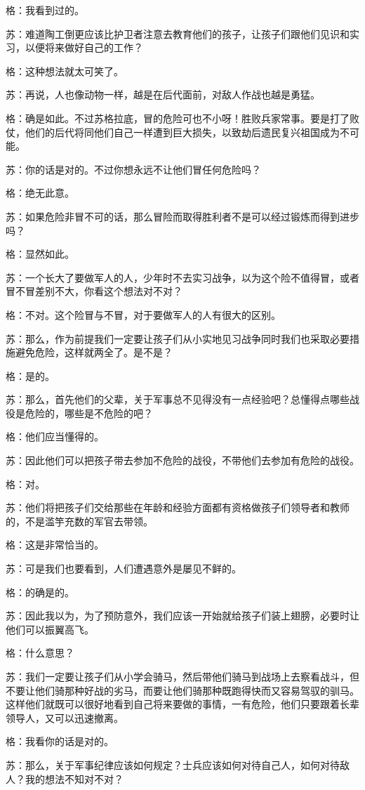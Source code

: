 \documentclass[12pt,oneside]{book}
\begin{document}
格：我看到过的。

苏：难道陶工倒更应该比护卫者注意去教育他们的孩子，让孩子们跟他们见识和实习，以便将来做好自己的工作？

格：这种想法就太可笑了。

苏：再说，人也像动物一样，越是在后代面前，对敌人作战也越是勇猛。

格：确是如此。不过苏格拉底，冒的危险可也不小呀！胜败兵家常事。要是打了败仗，他们的后代将同他们自己一样遭到巨大损失，以致劫后遗民复兴祖国成为不可能。

苏：你的话是对的。不过你想永远不让他们冒任何危险吗？

格：绝无此意。

苏：如果危险非冒不可的话，那么冒险而取得胜利者不是可以经过锻炼而得到进步吗？

格：显然如此。

苏：一个长大了要做军人的人，少年时不去实习战争，以为这个险不值得冒，或者冒不冒差别不大，你看这个想法对不对？

格：不对。这个险冒与不冒，对于要做军人的人有很大的区别。

苏：那么，作为前提我们一定要让孩子们从小实地见习战争同时我们也采取必要措施避免危险，这样就两全了。是不是？

格：是的。

苏：那么，首先他们的父辈，关于军事总不见得没有一点经验吧？总懂得点哪些战役是危险的，哪些是不危险的吧？

格：他们应当懂得的。

苏：因此他们可以把孩子带去参加不危险的战役，不带他们去参加有危险的战役。

格：对。

苏：他们将把孩子们交给那些在年龄和经验方面都有资格做孩子们领导者和教师的，不是滥竽充数的军官去带领。

格：这是非常恰当的。

苏：可是我们也要看到，人们遭遇意外是屡见不鲜的。

格：的确是的。

苏：因此我以为，为了预防意外，我们应该一开始就给孩子们装上翅膀，必要时让他们可以振翼高飞。

格：什么意思？

苏：我们一定要让孩子们从小学会骑马，然后带他们骑马到战场上去察看战斗，但不要让他们骑那种好战的劣马，而要让他们骑那种既跑得快而又容易驾驭的驯马。这样他们就既可以很好地看到自己将来要做的事情，一有危险，他们只要跟着长辈领导人，又可以迅速撤离。

格：我看你的话是对的。

苏：那么，关于军事纪律应该如何规定？士兵应该如何对待自己人，如何对待敌人？我的想法不知对不对？
\end{document}

